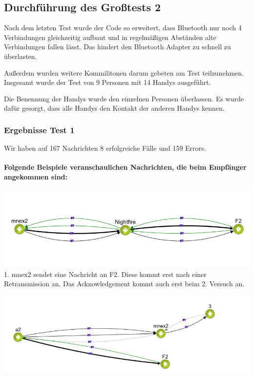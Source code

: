\subsection{Durchführung des Großtests 2}

Nach dem letzten Test wurde der Code so erweitert, dass Bluetooth nur
noch 4 Verbindungen gleichzeitig aufbaut und in regelmäßigen Abständen
alte Verbindungen fallen lässt. Das hindert den Bluetooth Adapter zu
schnell zu überlasten.

Außerdem wurden weitere Kommilitonen darum gebeten am Test teilzunehmen.
Insgesamt wurde der Test von 9 Personen mit 14 Handys ausgeführt.

Die Benennung der Handys wurde den einzelnen Personen überlassen. Es
wurde dafür gesorgt, dass alle Handys den Kontakt der anderen Handys
kennen.


\subsubsection{Ergebnisse Test 1}

Wir haben auf 167 Nachrichten 8 erfolgreiche Fälle und 159 Errors.

\paragraph{Folgende Beispiele veranschaulichen Nachrichten, die beim
Empfänger angekommen sind:}

\includegraphics[width=1.0\textwidth]{belege/grosstests/Bilder/Grosstest2/Test1Erfolg2.jpg}
1. mnex2 sendet eine Nachricht an F2. Diese kommt erst nach einer
Retransmission an. Das Acknowledgement kommt auch erst beim 2. Versuch
an.

\includegraphics[width=1.0\textwidth]{belege/grosstests/Bilder/Grosstest2/Test1Erfolg1.jpg}

